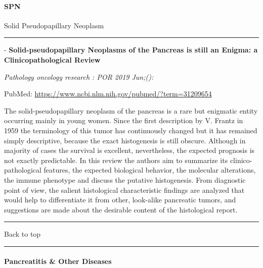 \documentclass[]{article}
\let\oldparagraph\paragraph
\renewcommand{\paragraph}[1]{\oldparagraph{#1}\mbox{}}
\begin{document}
\pagebreak

\hypertarget{spn}{%
\paragraph{SPN}\label{spn}}

Solid Pseudopapillary Neoplasm

\begin{center}\rule{0.5\linewidth}{\linethickness}\end{center}

 - \textbf{Solid-pseudopapillary Neoplasms of the Pancreas is still an
Enigma: a Clinicopathological Review}

\emph{Pathology oncology research : POR 2019 Jun;():}

PubMed: \url{https://www.ncbi.nlm.nih.gov/pubmed/?term=31209654}

The solid-pseudopapillary neoplasm of the pancreas is a rare but
enigmatic entity occurring mainly in young women. Since the first
description by V. Frantz in 1959 the terminology of this tumor has
continuously changed but it has remained simply descriptive, because the
exact histogenesis is still obscure. Although in majority of cases the
survival is excellent, nevertheless, the expected prognosis is not
exactly predictable. In this review the authors aim to summarize its
clinico-pathological features, the expected biological behavior, the
molecular alterations, the immune phenotype and discuss the putative
histogenesis. From diagnostic point of view, the salient histological
characteristic findings are analyzed that would help to differentiate it
from other, look-alike pancreatic tumors, and suggestions are made about
the desirable content of the histological report.

{}

{}

\begin{center}\rule{0.5\linewidth}{\linethickness}\end{center}

Back to top

\begin{center}\rule{0.5\linewidth}{\linethickness}\end{center}

\pagebreak

\hypertarget{pancreatitis-other-diseases}{%
\paragraph{Pancreatitis \& Other
Diseases}\label{pancreatitis-other-diseases}}
\end{document}
